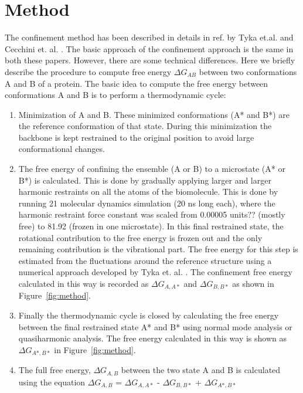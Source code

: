 \documentclass[12pt]{article}
\newcommand{\Alberto}[1]{\color{ForestGreen}#1\normalcolor }
\begin{document}
\section{Method}

The confinement method has been described in details in ref. by Tyka et.al. \cite{Tyka2006} and
Cecchini et. al. \cite{Cecchini2009}. The basic approach of the confinement approach is the same in
both these papers. However, there are some technical differences. Here we briefly describe the
procedure to compute free energy $\Delta G_{AB}$ between two conformations A and B of a protein. The
basic idea to compute the free energy between conformations A and B is to perform a thermodynamic
cycle:

\begin{enumerate}

\item  Minimization of A and B. These minimized conformations (A* and B*)
       are the reference conformation of that state. During this minimization the backbone is kept
       restrained to the original position to avoid large conformational changes.

   \item  The free energy of confining the ensemble (A or B) to a microstate (A* or B*) is
       calculated. This is done by gradually applying larger and larger
       harmonic restraints on all the atoms of the biomolecule. This is done by running 21 molecular dynamics simulation 
       (20 ns long each), where the harmonic restraint force constant was scaled from 0.00005
       \Alberto{units??}
       (mostly free) to 81.92 (frozen in one microstate). In this final restrained state, the
       rotational contribution to the free energy is frozen out
       and the only remaining contribution is the vibrational part. The free energy for this step is
       estimated from the fluctuations around
       the reference structure using a numerical
       approach developed by Tyka et. al. \cite{Tyka2006}. The confinement free energy calculated in
       this way is recorded as 
       $\Delta G_{A,A*}$ and $\Delta G_{B,B*}$ as shown in Figure~\ref{fig:method}.     

\item  Finally the thermodynamic cycle is closed by calculating the free energy between the final
       restrained state A* and B* using normal mode analysis or quasiharmonic analysis. The free energy calculated in 
       this way is shown as $\Delta G_{A*,B*}$ in Figure~\ref{fig:method}.

\item  The full free energy, $\Delta G_{A,B}$ between the two state A and B is calculated using the equation 
       $\Delta G_{A,B}$ = $\Delta G_{A,A*}$ - $\Delta G_{B,B*}$ + $\Delta G_{A*,B*}$  

\end{enumerate}
\end{document}
